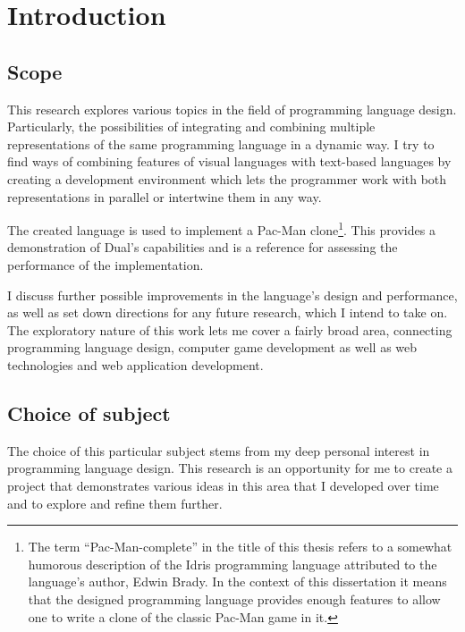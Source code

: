 \chapter{Introduction}\label{chap:intro}


\section{Scope}
This research explores various topics in the field of programming language 
design. Particularly, the possibilities of integrating and combining multiple 
representations of the same programming language in a dynamic way. I try to 
find ways of combining features of visual languages with text-based languages 
by creating a development environment which lets the programmer work with both 
representations in parallel or intertwine them in any way.

The created language is used to implement a Pac-Man clone\footnote{The term ``Pac-Man-complete'' in the title of this thesis refers to a somewhat humorous description of the Idris programming language\cite{idris} attributed to the language's author, Edwin Brady\cite{pacman_complete}. In the context of this dissertation it means that the designed programming language provides enough features to allow one to write a clone of the classic Pac-Man game in it.}. This provides a demonstration of Dual's capabilities and is a reference for assessing the performance of the implementation.

I discuss further possible improvements in the language's design and performance, as well as set down directions for any future research, which I intend to take on. The exploratory nature of this work lets me cover a fairly broad area, connecting programming language design, computer game development as well as web technologies and web application development.

\section{Choice of subject}
The choice of this particular subject stems from my deep personal interest in programming language design. This research is an opportunity for me to create a project that demonstrates various ideas in this area that I developed over time and to explore and refine them further.

